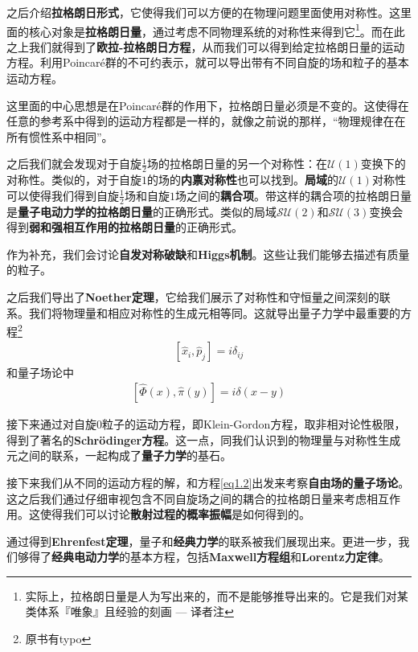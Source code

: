 之后介绍{\bf 拉格朗日形式}，它使得我们可以方便的在物理问题里面使用对称性。这里面的核心对象是{\bf 拉格朗日量}，通过考虑不同物理系统的对称性来得到它\footnote{实际上，拉格朗日量是人为写出来的，而不是能够推导出来的。它是我们对某类体系『唯象』且经验的刻画 --- 译者注}。而在此之上我们就得到了{\bf 欧拉-拉格朗日方程}，从而我们可以得到给定拉格朗日量的运动方程。利用Poincar\'e群的不可约表示，就可以导出带有不同自旋的场和粒子的基本运动方程。

这里面的中心思想是在Poincar\'e群的作用下，拉格朗日量必须是不变的。这使得在任意的参考系中得到的运动方程都是一样的，就像之前说的那样，“物理规律在在所有惯性系中相同”。

之后我们就会发现对于自旋$\tfrac{1}{2}$场的拉格朗日量的另一个对称性：在$\mathcal{U}(1)$变换下的对称性。类似的，对于自旋$1$的场的{\bf 内禀对称性}也可以找到。{\bf 局域}的$\mathcal{U}(1)$对称性可以使得我们得到自旋$\tfrac{1}{2}$场和自旋$1$场之间的{\bf 耦合项}。带这样的耦合项的拉格朗日量是{\bf 量子电动力学的拉格朗日量}的正确形式。类似的局域$\mathcal{SU}(2)$和$\mathcal{SU}(3)$变换会得到{\bf 弱和强相互作用的拉格朗日量}的正确形式。

作为补充，我们会讨论{\bf 自发对称破缺}和{\bf Higgs机制}。这些让我们能够去描述有质量的粒子。

之后我们导出了{\bf Noether定理}，它给我们展示了对称性和守恒量之间深刻的联系。我们将物理量和相应对称性的生成元相等同。这就导出量子力学中最重要的方程\footnote{原书有typo}
\begin{align}\label{eq1.1}
[\hat{x}_i,\hat{p}_j]=i\delta_{ij}
\end{align}
和量子场论中
\begin{align}\label{eq1.2}
[\hat{\Phi}(x),\hat{\pi}(y)]=i\delta(x-y)
\end{align}

接下来通过对自旋$0$粒子的运动方程，即Klein-Gordon方程，取非相对论性极限，得到了著名的{\bf Schrödinger方程}。这一点，同我们认识到的物理量与对称性生成元之间的联系，一起构成了{\bf 量子力学}的基石。

接下来我们从不同的运动方程的解，和方程\eqref{eq1.2}出发来考察{\bf 自由场的量子场论}。这之后我们通过仔细审视包含不同自旋场之间的耦合的拉格朗日量来考虑相互作用。这使得我们可以讨论{\bf 散射过程的概率振幅}是如何得到的。

通过得到{\bf Ehrenfest定理}，量子和{\bf 经典力学}的联系被我们展现出来。更进一步，我们够得了{\bf 经典电动力学}的基本方程，包括{\bf Maxwell方程组}和{\bf Lorentz力定律}。

